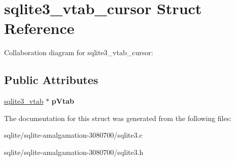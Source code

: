 \hypertarget{structsqlite3__vtab__cursor}{\section{sqlite3\+\_\+vtab\+\_\+cursor Struct Reference}
\label{structsqlite3__vtab__cursor}
}


Collaboration diagram for sqlite3\+\_\+vtab\+\_\+cursor\+:
\subsection*{Public Attributes}
\begin{DoxyCompactItemize}
\item 
\hypertarget{structsqlite3__vtab__cursor_a7bb57f3f9c7c618a9d6d33c6d9820bdc}{\hyperlink{structsqlite3__vtab}{sqlite3\+\_\+vtab} $\ast$ {\bfseries p\+Vtab}}\label{structsqlite3__vtab__cursor_a7bb57f3f9c7c618a9d6d33c6d9820bdc}

\end{DoxyCompactItemize}


The documentation for this struct was generated from the following files\+:\begin{DoxyCompactItemize}
\item 
sqlite/sqlite-\/amalgamation-\/3080700/sqlite3.\+c\item 
sqlite/sqlite-\/amalgamation-\/3080700/sqlite3.\+h\end{DoxyCompactItemize}
